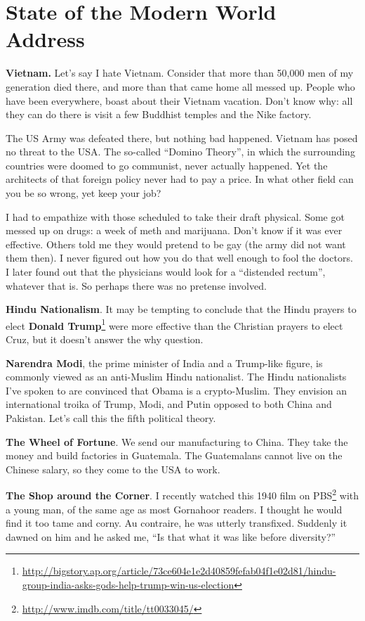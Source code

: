 \section{State of the Modern World Address}

\textbf{Vietnam.} Let's say I hate Vietnam. Consider that more than 50,000 men of my generation died there, and more than that came home all messed up. People who have been everywhere, boast about their Vietnam vacation. Don't know why: all they can do there is visit a few Buddhist temples and the Nike factory.

The US Army was defeated there, but nothing bad happened. Vietnam has posed no threat to the USA. The so-called ``Domino Theory'', in which the surrounding countries were doomed to go communist, never actually happened. Yet the architects of that foreign policy never had to pay a price. In what other field can you be so wrong, yet keep your job?

I had to empathize with those scheduled to take their draft physical. Some got messed up on drugs: a week of meth and marijuana. Don't know if it was ever effective. Others told me they would pretend to be gay (the army did not want them then). I never figured out how you do that well enough to fool the doctors. I later found out that the physicians would look for a ``distended rectum'', whatever that is. So perhaps there was no pretense involved.

\textbf{Hindu Nationalism}. It may be tempting to conclude that the Hindu prayers to elect \textbf{Donald Trump}\footnote{\url{http://bigstory.ap.org/article/73ce604e1e2d40859fefab04f1e02d81/hindu-group-india-asks-gods-help-trump-win-us-election}} were more effective than the Christian prayers to elect Cruz, but it doesn't answer the why question.

\textbf{Narendra Modi}, the prime minister of India and a Trump-like figure, is commonly viewed as an anti-Muslim Hindu nationalist. The Hindu nationalists I've spoken to are convinced that Obama is a crypto-Muslim. They envision an international troika of Trump, Modi, and Putin opposed to both China and Pakistan. Let's call this the fifth political theory.

\textbf{The Wheel of Fortune}. We send our manufacturing to China. They take the money and build factories in Guatemala. The Guatemalans cannot live on the Chinese salary, so they come to the USA to work.

\textbf{The Shop around the Corner}. I recently watched this 1940 film on PBS\footnote{\url{http://www.imdb.com/title/tt0033045/}} with a young man, of the same age as most Gornahoor readers. I thought he would find it too tame and corny. Au contraire, he was utterly transfixed. Suddenly it dawned on him and he asked me, ``Is that what it was like before diversity?''

